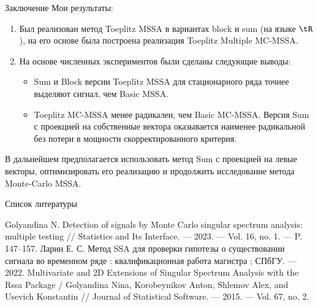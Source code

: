 \documentclass[ucs, notheorems, handout]{beamer}
\begin{document}
\begin{frame}{Заключение}
	Мои результаты:
	\begin{enumerate}
		\item Был реализован метод Toeplitz MSSA в вариантах block и sum (на языке $\tR$), на его основе была построена реализация Toeplitz Multiple MC-MSSA.
		\item На основе численных экспериментов были сделаны следующие выводы:
		\begin{itemize}
			\item Sum и Block версии Toeplitz MSSA для стационарного ряда точнее выделяют сигнал, чем Basic MSSA.\vspace{0.25em}
			\item Toeplitz MC-MSSA менее радикален, чем Basic MC-MSSA. Версия Sum с проекцией на собственные вектора оказывается наименее радикальной без потери в мощности скорректированного критерия.
		\end{itemize}
	\end{enumerate}
	В дальнейшем предполагается использовать метод Sum с проекцией на левые векторы, оптимизировать его реализацию и продолжить исследование метода Monte-Carlo MSSA.
\end{frame}

\begin{frame}{Список литературы}
	\begin{thebibliography}{3}
		Golyandina N. Detection of signals by Monte Carlo singular spectrum analysis: multiple testing // Statistics and Its Interface. — 2023. — Vol. 16, no. 1. — P. 147–157.
		Ларин Е. С. Метод SSA для проверки гипотезы о существовании сигнала во временном ряде : квалификационная работа магистра ; СПбГУ. — 2022.
		Multivariate and 2D Extensions of Singular Spectrum Analysis with the Rssa Package /
		Golyandina Nina, Korobeynikov Anton, Shlemov Alex, and Usevich Konstantin // Journal of Statistical Software. — 2015. — Vol. 67, no. 2.
	\end{thebibliography}
\end{frame}
\end{document}
